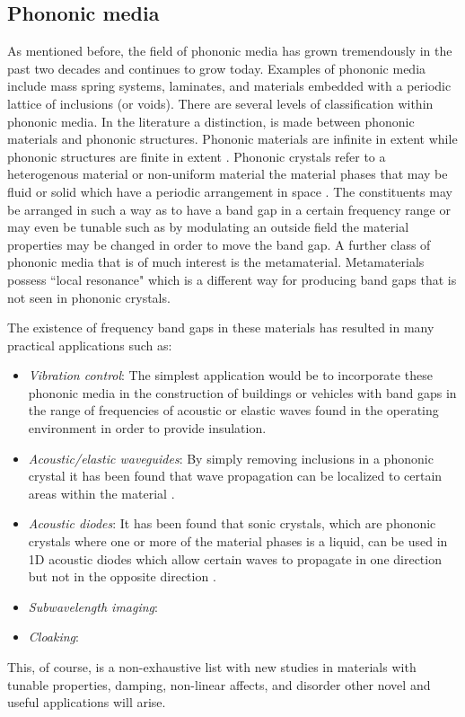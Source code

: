 \documentclass{article}
\begin{document}
\subsection{Phononic media}
As mentioned before, the field of phononic media has grown tremendously in the 
past two decades and continues to grow today. Examples of phononic media 
include mass spring systems, laminates, and materials embedded with a periodic 
lattice of inclusions (or voids). There are several levels of classification 
within phononic media. In the literature a distinction, is made between 
phononic materials and phononic structures. Phononic materials are infinite in 
extent while phononic structures are finite in extent \cite{hussein10}. 
Phononic crystals refer to a heterogenous material or non-uniform material the 
material phases that may be fluid or solid which have a periodic arrangement in 
space \cite{hussein14}. The constituents may be arranged in such a way as to 
have a band gap in a certain frequency range or may even be tunable such as by 
modulating an outside field the material properties may be changed in order to 
move the band gap. A further class of phononic media that is of much interest 
is the metamaterial. Metamaterials possess ``local resonance" which is a 
different way for producing band gaps that is not seen in phononic crystals. 

The existence of frequency band gaps in these materials has resulted in many 
practical applications such as:
\begin{itemize}
	\item \emph{Vibration control}: The simplest application would be to 
	incorporate these phononic media in the construction of buildings or 
	vehicles with band gaps in the range of frequencies of acoustic or elastic 
	waves found in the operating environment in order to provide insulation.
	\item \emph{Acoustic/elastic waveguides}: By simply removing inclusions in 
	a phononic crystal it has been found that wave propagation can be localized 
	to certain areas within the material \cite{hou12}. 
	\item \emph{Acoustic diodes}: It has been found that sonic 
	crystals, which are phononic crystals where one or more of the material 
	phases is a liquid, can be used in 1D acoustic diodes which allow certain 
	waves to propagate in one direction but not in the opposite direction 
	\cite{zhang10}.
	\item \emph{Subwavelength imaging}: \cite{sukhovich09}
	\item \emph{Cloaking}: \cite{norris11}
\end{itemize}
This, of course, is a non-exhaustive list with new studies in materials with 
tunable properties, damping, non-linear affects, and disorder other novel and 
useful applications will arise.
\end{document}
